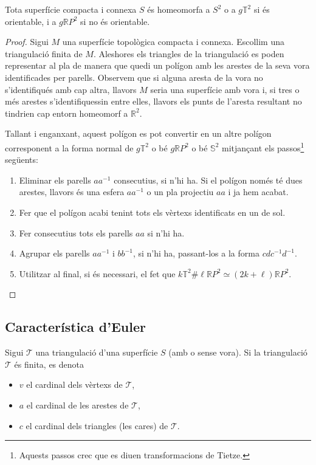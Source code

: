 \documentclass[../main.tex]{subfiles}
\begin{document}
\begin{ter}
\label{ter:teoremadeclassificaciodesuperficies2.0} Tota superfície compacta i connexa $S$ és homeomorfa a $S^2$ o a $g\mathbb{T}^2$ si és orientable, i a $g\mathbb{R}P^2$ si no és orientable. 
\end{ter}
\begin{proof}
Sigui $M$ una superfície topològica compacta i connexa. Escollim una triangulació finita de $M$. Aleshores els triangles de la triangulació es poden representar al pla de manera que quedi un polígon amb les arestes de la seva vora identificades per parells. Observem que si alguna aresta de la vora no s'identifiqués amb cap altra, llavors $M$ seria una superfície amb vora i, si tres o més arestes s'identifiquessin entre elles, llavors els punts de l'aresta resultant no tindrien cap entorn homeomorf a $\mathbb{R}^2$.

Tallant i enganxant, aquest polígon es pot convertir en un altre polígon corresponent a la forma normal de $g\mathbb{T}^2$ o bé $g\mathbb{R}P^2$ o bé $\mathbb{S}^2$ mitjançant els passos\footnote{Aquests passos crec que es diuen transformacions de Tietze.} següents:
\begin{enumerate}
    \item Eliminar els parells $aa^{-1}$ consecutius, si n'hi ha. Si el polígon només té dues arestes, llavors és una esfera $aa^{-1}$ o un pla projectiu $aa$ i ja hem acabat. 
    \item Fer que el polígon acabi tenint tots els vèrtexs identificats en un de sol.
    \item Fer consecutius tots els parells $aa$ si n'hi ha.
    \item Agrupar els parells $aa^{-1}$ i $bb^{-1}$, si n'hi ha, passant-los a la forma $cdc^{-1}d^{-1}$.
    \item Utilitzar al final, si és necessari, el fet que $k\mathbb{T}^2\#\ell\mathbb{R}P^2\simeq (2k+\ell)\mathbb{R}P^2$.
\end{enumerate}
\end{proof}


\subsection{Característica d'Euler}

Sigui $\mathcal{T}$ una triangulació d'una superfície $S$ (amb o sense vora). Si la triangulació $\mathcal{T}$ és finita, es denota
\begin{itemize}
    \item $v$ el cardinal dels vèrtexs de $\mathcal{T}$,
    \item $a$ el cardinal de les arestes de $\mathcal{T}$,
    \item $c$ el cardinal dels triangles (les cares) de $\mathcal{T}$.
\end{itemize}
\end{document}
